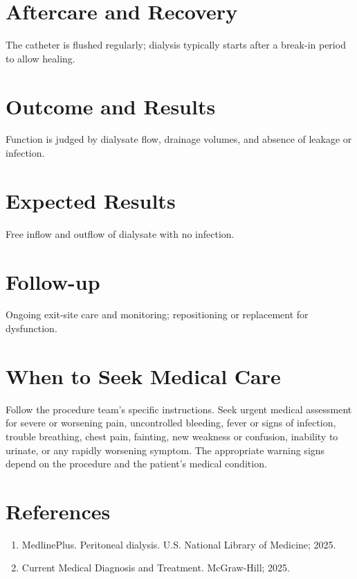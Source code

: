 \section*{Aftercare and Recovery}
The catheter is flushed regularly; dialysis typically starts after a break-in period to allow healing.

\section*{Outcome and Results}
Function is judged by dialysate flow, drainage volumes, and absence of leakage or infection.

\section*{Expected Results}
Free inflow and outflow of dialysate with no infection.

\section*{Follow-up}
Ongoing exit-site care and monitoring; repositioning or replacement for dysfunction.

\section*{When to Seek Medical Care}
Follow the procedure team's specific instructions. Seek urgent medical assessment for severe or worsening pain, uncontrolled bleeding, fever or signs of infection, trouble breathing, chest pain, fainting, new weakness or confusion, inability to urinate, or any rapidly worsening symptom. The appropriate warning signs depend on the procedure and the patient's medical condition.

\section*{References}
\begin{enumerate}
  \item MedlinePlus. Peritoneal dialysis. U.S. National Library of Medicine; 2025.
  \item Current Medical Diagnosis and Treatment. McGraw-Hill; 2025.
\end{enumerate}

\clearpage
